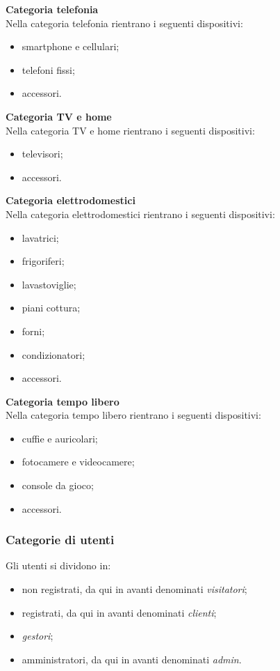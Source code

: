 \documentclass[a4paper, 14pt]{article}
\begin{document}
\begin{flushleft}
			\bigskip \textbf{Categoria telefonia} \\ \smallskip
			Nella categoria telefonia rientrano i seguenti dispositivi:
			\begin{itemize}
				\item smartphone e cellulari;
				\item telefoni fissi;
				\item accessori.
			\end{itemize}
				
			\bigskip \textbf{Categoria TV e home} \\ \smallskip
			Nella categoria TV e home rientrano i seguenti dispositivi:
			\begin{itemize}
				\item televisori;
				\item accessori.
			\end{itemize}
			
			\bigskip \textbf{Categoria elettrodomestici} \\ \smallskip
			Nella categoria elettrodomestici rientrano i seguenti dispositivi:
			\begin{itemize}
				\item lavatrici;
				\item frigoriferi;
				\item lavastoviglie;
				\item piani cottura;
				\item forni;
				\item condizionatori;
				\item accessori.
			\end{itemize}			
			
			\bigskip \textbf{Categoria tempo libero} \\ \smallskip
			Nella categoria tempo libero rientrano i seguenti dispositivi:
			\begin{itemize}
				\item cuffie e auricolari;
				\item fotocamere e videocamere;
				\item console da gioco;
				\item accessori.
			\end{itemize}			
			
			\subsubsection{Categorie di utenti}
			Gli utenti si dividono in:
			\begin{itemize}
				\item non registrati, da qui in avanti denominati \textit{visitatori};
				\item registrati, da qui in avanti denominati \textit{clienti};
				\item \textit{gestori};
				\item amministratori, da qui in avanti denominati \textit{admin}.
			\end{itemize}
			

\end{flushleft}
\end{document}
